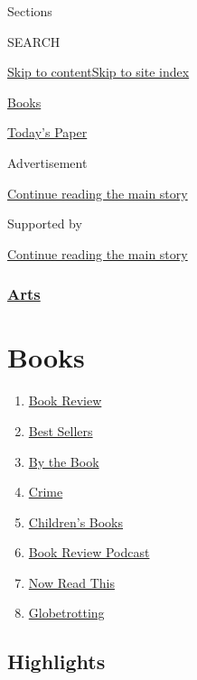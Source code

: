 Sections

SEARCH

\protect\hyperlink{site-content}{Skip to
content}\protect\hyperlink{site-index}{Skip to site index}

\href{https://www.nytimes3xbfgragh.onion/section/books}{Books}

\href{https://myaccount.nytimes3xbfgragh.onion/auth/login?response_type=cookie\&client_id=vi}{}

\href{https://www.nytimes3xbfgragh.onion/section/todayspaper}{Today's
Paper}

Advertisement

\protect\hyperlink{after-top}{Continue reading the main story}

Supported by

\protect\hyperlink{after-sponsor}{Continue reading the main story}

\hypertarget{arts}{%
\subsubsection{\texorpdfstring{\href{arts}{Arts}}{Arts}}\label{arts}}

\hypertarget{books}{%
\section{Books}\label{books}}

\begin{enumerate}
\def\labelenumi{\arabic{enumi}.}
\tightlist
\item
  \href{/section/books/review}{Book Review}
\item
  \href{/books/best-sellers/}{Best Sellers}
\item
  \href{/column/by-the-book}{By the Book}
\item
  \href{/column/crime}{Crime}
\item
  \href{/column/childrens-books}{Children's Books}
\item
  \href{/column/book-review-podcast}{Book Review Podcast}
\item
  \href{/spotlight/now-read-this}{Now Read This}
\item
  \href{/interactive/2020/01/08/books/new-books-international.html}{Globetrotting}
\end{enumerate}

\hypertarget{highlights}{%
\subsection{Highlights}\label{highlights}}


